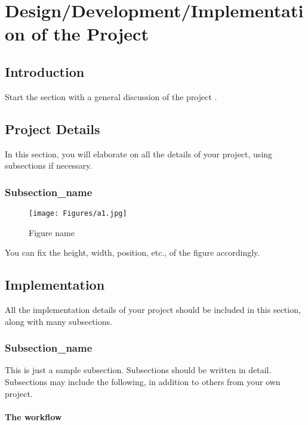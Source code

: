 \documentclass[12pt]{report}
\begin{document}
\chapter{Design/Development/Implementation of the Project}

\section{Introduction}
Start the section with a general discussion of the project  \cite{sivarajah2017critical} \cite{laney20013d} \cite{WinNT}. 

\section{Project Details}
In this section, you will elaborate on all the details of your project, using subsections if necessary.

\subsection{Subsection\_name}


\begin{figure}[h]
        \begin{center}
         \texttt{[image: Figures/a1.jpg]}
        \end{center}
        \caption{Figure name}
     \end{figure}

     
You can fix the height, width, position, etc., of the figure accordingly.

\section{Implementation}
All the implementation details of your project should be included in this section, along with many subsections.

\subsection{Subsection\_name}
This is just a sample subsection. Subsections should be written in detail. Subsections may include the following, in addition to others from your own project.


\subsubsection{The workflow}
\end{document}
